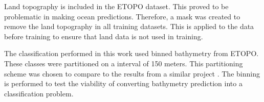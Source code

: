 \par
Land topography is included in the \ac{ETOPO} dataset.
This proved to be problematic in making ocean predictions.
Therefore, a mask was created to remove the land topography in all training datasets.
This is applied to the data before training to ensure that land data is not used in training.

\par
The classification performed in this work used binned bathymetry from \ac{ETOPO}.
These classes were partitioned on a interval of 150 meters.
This partitioning scheme was chosen to compare to the results from a similar project \cite{jena2012prediction}.
The binning is performed to test the viability of converting bathymetry prediction into a classification problem.
